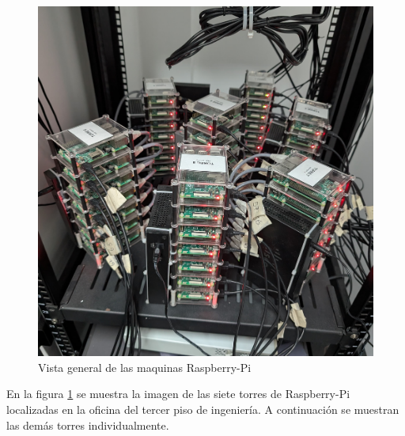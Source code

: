 \begin{figure}[H]
	\centering
	\includegraphics[scale=0.07]{tablas-images/raspberries/torres-raspberries.jpg}
	\caption{Vista general de las maquinas Raspberry-Pi}
	\label{fig:foto-torres-rasp}
\end{figure}


\noindent
En la figura \ref{fig:foto-torres-rasp} se muestra la imagen de las siete torres de Raspberry-Pi localizadas en la oficina del tercer piso de ingeniería. A continuación se muestran las demás torres individualmente.


